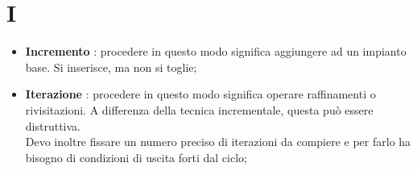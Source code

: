 % 
%
% 
%

\section{I}

\begin{itemize}
	\item \textbf{Incremento} : procedere in questo modo significa aggiungere ad un impianto base. Si inserisce, ma non si toglie;

	\item \textbf{Iterazione} : procedere in questo modo significa operare raffinamenti o rivisitazioni. A differenza della tecnica incrementale, questa può essere distruttiva. \\
Devo inoltre fissare un numero preciso di iterazioni da compiere e per farlo ha bisogno di condizioni di uscita forti dal ciclo;

\end{itemize}